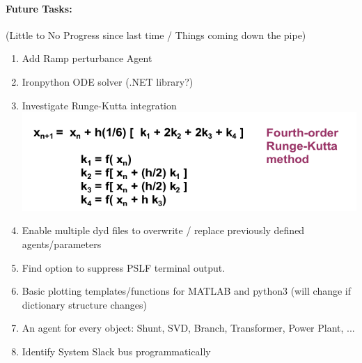 \documentclass[12pt]{article}
\begin{document}
\paragraph{Future Tasks:}(Little to No Progress since last time / Things coming down the pipe)
	\begin{enumerate}
		\item Add Ramp perturbance Agent
		\item Ironpython ODE solver (.NET library?)
		\item Investigate Runge-Kutta integration\\
		\includegraphics[width=.7\linewidth]{rk4}
		\item Enable multiple dyd files to overwrite / replace previously defined agents/parameters
		
		\item Find option to suppress PSLF terminal output.
		\item Basic plotting templates/functions for MATLAB and python3 (will change if dictionary structure changes)
		
		\item An agent for every object: Shunt, SVD, Branch, Transformer, Power Plant, ...

		\item Identify System Slack bus programmatically
		
	\end{enumerate}
\end{document}
